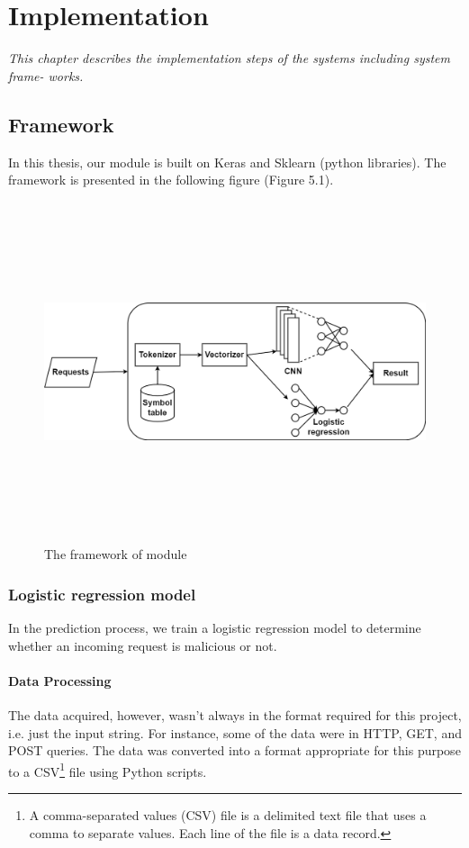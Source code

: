 \chapter{Implementation}
\label{chap:implementation}
	\textit{\hspace{0.5cm}This chapter describes the implementation steps of the systems including system frame- works.}
\minitoc
 
 
\section{Framework}
\label{sec:framework}
\hspace{0.5cm}In this thesis, our module is built on Keras and Sklearn (python libraries). The framework is presented in the following figure (Figure 5.1).

\begin{figure}[ht]
	\centering
	\includegraphics[width=\linewidth, height=10cm,keepaspectratio]{figures/Untitled Diagram.drawio (1).png}
  \caption{The framework of module}
\end{figure}   

\subsection{Logistic regression model}
\hspace{0.5cm}In the prediction process, we train a logistic regression model to determine whether an incoming request is malicious or not.
\subsubsection{Data Processing}
\hspace{0.5cm}The data acquired, however, wasn't always in the format required for this project, i.e. just the input string. For instance, some of the data were in HTTP, GET, and POST queries. The data was converted into a format appropriate for this purpose to a CSV\footnote{A comma-separated values (CSV) file is a delimited text file that uses a comma to separate values. Each line of the file is a data record.} file using Python scripts.

